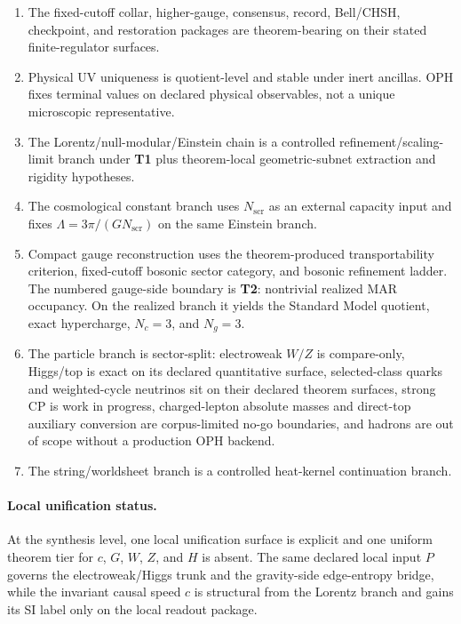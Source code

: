 \begin{enumerate}[leftmargin=2em]
\item The fixed-cutoff collar, higher-gauge, consensus, record, Bell/CHSH, checkpoint, and
restoration packages are theorem-bearing on their stated finite-regulator surfaces.
\item Physical UV uniqueness is quotient-level and stable under inert ancillas. OPH fixes terminal
values on declared physical observables, not a unique microscopic representative.
\item The Lorentz/null-modular/Einstein chain is a controlled refinement/scaling-limit branch
under \textbf{T1} plus theorem-local geometric-subnet extraction and rigidity hypotheses.
\item The cosmological constant branch uses \(N_{\mathrm{scr}}\) as an external capacity input and
fixes \(\Lambda=3\pi/(G N_{\mathrm{scr}})\) on the same Einstein branch.
\item Compact gauge reconstruction uses the theorem-produced transportability criterion, fixed-cutoff bosonic sector category, and bosonic refinement ladder. The numbered gauge-side boundary is \textbf{T2}: nontrivial realized MAR occupancy. On the realized branch it yields the Standard Model quotient, exact hypercharge, \(N_c=3\), and \(N_g=3\).
\item The particle branch is sector-split: electroweak \(W/Z\) is compare-only, Higgs/top is exact on its declared quantitative surface, selected-class quarks and weighted-cycle neutrinos sit on their declared theorem surfaces, strong CP is work in progress, charged-lepton absolute masses and direct-top auxiliary conversion are corpus-limited no-go boundaries, and hadrons are out of scope without a production OPH backend.
\item The string/worldsheet branch is a controlled heat-kernel continuation branch.
\end{enumerate}

\paragraph{Local unification status.}
At the synthesis level, one local unification surface is explicit and one uniform theorem tier for
\(c\), \(G\), \(W\), \(Z\), and \(H\) is absent. The same declared local input \(P\) governs the
electroweak/Higgs trunk and the gravity-side edge-entropy bridge, while the invariant causal speed
\(c\) is structural from the Lorentz branch and gains its SI label only on the local readout
package.

